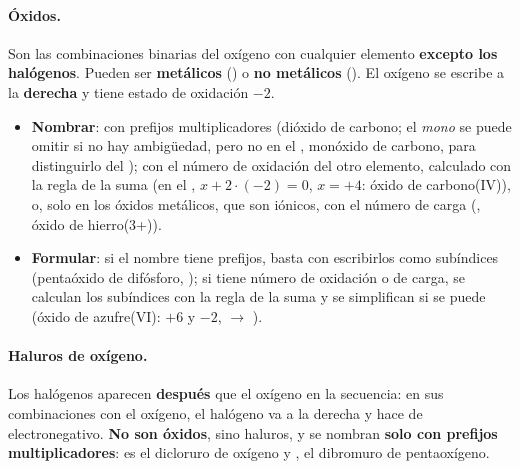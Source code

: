 \paragraph{Óxidos.} Son las combinaciones binarias del oxígeno con cualquier elemento \textbf{excepto los halógenos}. Pueden ser
\textbf{metálicos} () o \textbf{no metálicos} (). El oxígeno se escribe a la \textbf{derecha} y tiene estado
de oxidación \(-2\).

\begin{itemize}
    \item \textbf{Nombrar}: con prefijos multiplicadores (dióxido de carbono; el \textit{mono} se puede omitir si no hay
    ambigüedad, pero no en el , monóxido de carbono, para distinguirlo del ); con el número de oxidación del
    otro elemento, calculado con la regla de la suma (en el , \(x + 2 \cdot (-2) = 0\), \(x = +4\): óxido de
    carbono(IV)), o, solo en los óxidos metálicos, que son iónicos, con el número de carga (, óxido de hierro(3+)).
    \item \textbf{Formular}: si el nombre tiene prefijos, basta con escribirlos como subíndices (pentaóxido de difósforo,
    ); si tiene número de oxidación o de carga, se calculan los subíndices con la regla de la suma y se simplifican si se
    puede (óxido de azufre(VI): \(+6\) y \(-2\),  \(\rightarrow\) ).
\end{itemize}

\paragraph{Haluros de oxígeno.} Los halógenos aparecen \textbf{después} que el oxígeno en la secuencia: en sus combinaciones con
el oxígeno, el halógeno va a la derecha y hace de electronegativo. \textbf{No son óxidos}, sino haluros, y se nombran
\textbf{solo con prefijos multiplicadores}:  es el dicloruro de oxígeno y , el dibromuro de pentaoxígeno.

